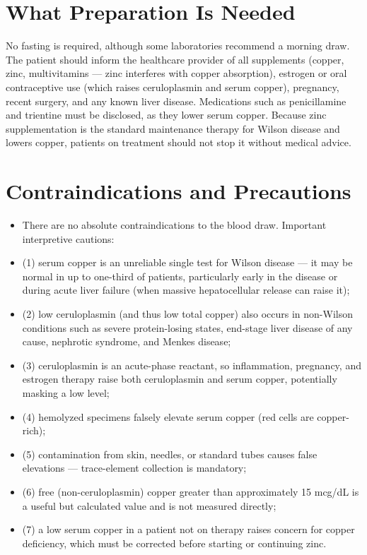 \section*{What Preparation Is Needed}
No fasting is required, although some laboratories recommend a morning draw. The patient should inform the healthcare provider of all supplements (copper, zinc, multivitamins --- zinc interferes with copper absorption), estrogen or oral contraceptive use (which raises ceruloplasmin and serum copper), pregnancy, recent surgery, and any known liver disease. Medications such as penicillamine and trientine must be disclosed, as they lower serum copper. Because zinc supplementation is the standard maintenance therapy for Wilson disease and lowers copper, patients on treatment should not stop it without medical advice.

\section*{Contraindications and Precautions}
\begin{itemize}
  \item There are no absolute contraindications to the blood draw. Important interpretive cautions:
  \item (1) serum copper is an unreliable single test for Wilson disease --- it may be normal in up to one-third of patients, particularly early in the disease or during acute liver failure (when massive hepatocellular release can raise it);
  \item (2) low ceruloplasmin (and thus low total copper) also occurs in non-Wilson conditions such as severe protein-losing states, end-stage liver disease of any cause, nephrotic syndrome, and Menkes disease;
  \item (3) ceruloplasmin is an acute-phase reactant, so inflammation, pregnancy, and estrogen therapy raise both ceruloplasmin and serum copper, potentially masking a low level;
  \item (4) hemolyzed specimens falsely elevate serum copper (red cells are copper-rich);
  \item (5) contamination from skin, needles, or standard tubes causes false elevations --- trace-element collection is mandatory;
  \item (6) free (non-ceruloplasmin) copper greater than approximately 15 mcg/dL is a useful but calculated value and is not measured directly;
  \item (7) a low serum copper in a patient not on therapy raises concern for copper deficiency, which must be corrected before starting or continuing zinc.
\end{itemize}
